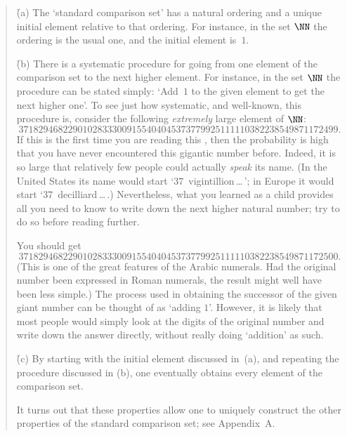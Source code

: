 \begin{quotation}
{        \h (a) The `standard comparison set' has a natural ordering and a unique initial element relative to that ordering.
    For instance, in the set ${\NN}$ the ordering is the usual one, and the initial element is~$1$.

        \h (b) There is a systematic procedure for going from one element of the comparison set to the next higher element.
    For instance, in the set ${\NN}$ the procedure can be stated simply:
    `Add~$1$ to the given element to get the next higher one'.
    To see just how systematic, and well-known, this procedure is, consider the following {\em extremely} large element of ${\NN}$:
        \begin{displaymath}
        37182946822901028333009155404045373779925111110382238549871172499.
        \end{displaymath}
    If this is the first time you are reading this {\em \Note}, then the probability is high that you have never encountered this gigantic number before.
    Indeed, it is so large that relatively few people could actually {\em speak} its name.
    (In the United States its name would start `$37$~vigintillion\,{\ldots}\,'; in Europe it would start `$37$~decilliard\,{\ldots}\,.)
    Nevertheless, what you learned as a child provides all you need to know to write down the next higher natural number; try to do so before reading further.

\V
\V

        You should get
        \begin{displaymath}
        37182946822901028333009155404045373779925111110382238549871172500.
        \end{displaymath}
    (This is one of the great features of the Arabic numerals. Had the original number been expressed in Roman numerals,
    the result might well have been less simple.) The process used in obtaining the successor of the given giant number can be thought of as `adding $1$'.
    However, it is likely that most people would simply look at the digits of the original number and write down the answer directly,
    without really doing `addition' as such.

        \h (c) By starting with the initial element discussed in~(a), and repeating the procedure discussed in (b),
    one eventually obtains every element of the comparison set.

\noindent It turns out that these properties allow one to uniquely construct the other properties of the standard comparison set; see Appendix~A.
}%
\end{quotation}



